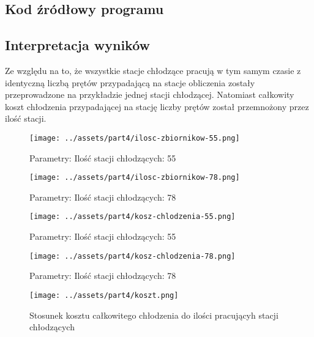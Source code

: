\documentclass[
	12pt, %
]{fphw}
\begin{document}
\newpage

\subsection{Kod źródłowy programu}






\subsection{Interpretacja wyników}

Ze względu na to, że wszystkie stacje chłodzące pracują w tym samym czasie z identyczną liczbą prętów przypadającą
na stacje obliczenia zostały przeprowadzone na przykładzie jednej stacji chłodzącej.
Natomiast całkowity koszt chłodzenia przypadającej na stację
liczby prętów został przemnożony przez ilość stacji.

\begin{figure}[H]
	\texttt{[image: ../assets/part4/ilosc-zbiornikow-55.png]}
	\caption{Parametry: Ilość stacji chłodzących: 55}

	\texttt{[image: ../assets/part4/ilosc-zbiornikow-78.png]}
	\caption{Parametry: Ilość stacji chłodzących: 78}
\end{figure}

\begin{figure}[H]
	\texttt{[image: ../assets/part4/kosz-chlodzenia-55.png]}
	\caption{Parametry: Ilość stacji chłodzących: 55}

	\texttt{[image: ../assets/part4/kosz-chlodzenia-78.png]}
	\caption{Parametry: Ilość stacji chłodzących: 78}
\end{figure}

\begin{figure}[H]
	\texttt{[image: ../assets/part4/koszt.png]}
	\caption{Stosunek kosztu całkowitego chłodzenia do ilości pracującyh stacji chłodzących}
\end{figure}
\end{document}
